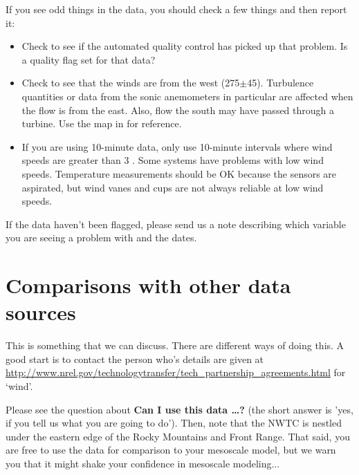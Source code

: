 {If you see odd things in the data, you should check a few things and then report it:
\begin{itemize}
\item Check to see if the automated quality control has picked up that problem. Is a quality flag set for that data?
\item Check to see that the winds are from the west (275\degree $\pm$45\degree). Turbulence quantities or data from the sonic anemometers in particular are affected when the flow is from the east. Also, flow the south may have passed through a turbine. Use the map in \cite{Clifton_55915} for reference.
\item If you are using 10-minute data, only use 10-minute intervals where wind speeds are greater than 3 \ms. Some systems have problems with low wind speeds. Temperature measurements should be OK because the sensors are aspirated, but wind vanes and cups are not always reliable at low wind speeds.
\end{itemize}
If the data haven't been flagged, please send us a note describing which variable you are seeing a problem with and the dates.}


\section{Comparisons with other data sources}
{This is something that we can discuss. There are different ways of doing this. A good start is to contact the person who's details are given at \url{http://www.nrel.gov/technologytransfer/tech_partnership_agreements.html} for `wind'.}

{Please see the question about \textbf{Can I use this data \ldots?} (the short answer is 'yes, if you tell us what you are going to do'). Then, note that the NWTC is nestled under the eastern edge of the Rocky Mountains and Front Range. That said, you are free to use the data for comparison to your mesoscale model, but we warn you that it might shake your confidence in mesoscale modeling...}

